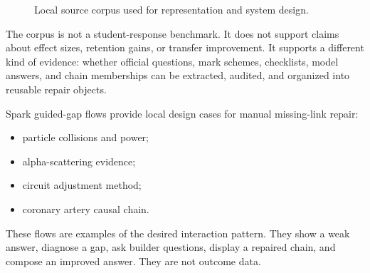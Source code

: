 \documentclass[11pt]{article}
\begin{document}
\begin{figure}[H]
\centering
{}
\caption{Local source corpus used for representation and system design.}
\label{fig:corpus}
\end{figure}

The corpus is not a student-response benchmark. It does not support claims about effect sizes, retention gains, or transfer improvement. It supports a different kind of evidence: whether official questions, mark schemes, checklists, model answers, and chain memberships can be extracted, audited, and organized into reusable repair objects.

Spark guided-gap flows provide local design cases for manual missing-link repair:

\begin{itemize}
\item particle collisions and power;
\item alpha-scattering evidence;
\item circuit adjustment method;
\item coronary artery causal chain.
\end{itemize}

These flows are examples of the desired interaction pattern. They show a weak answer, diagnose a gap, ask builder questions, display a repaired chain, and compose an improved answer. They are not outcome data.
\end{document}
